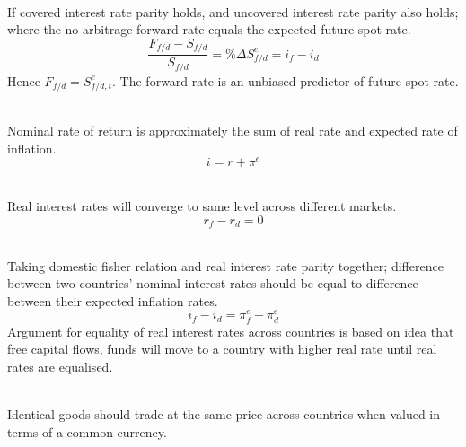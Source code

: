 \begin{definition} \\
If covered interest rate parity holds, and uncovered interest rate parity also holds; where the no-arbitrage forward rate equals the expected future spot rate.
\begin{equation}
\frac{F_{f/d} - S_{f/d}}{S_{f/d}} = \% \Delta S^e_{f/d} = i_f - i_d \nonumber
\end{equation}
Hence $F_{f/d} = S_{f/d, t}^e$. The forward rate is an unbiased predictor of future spot rate.
\end{definition}

\begin{definition} \\
Nominal rate of return is approximately the sum of real rate and expected rate of inflation.
\begin{equation}
i = r + \pi^e \nonumber
\end{equation}
\end{definition}

\begin{definition} \\
Real interest rates will converge to same level across different markets.
\begin{equation}
r_f - r_d = 0 \nonumber
\end{equation}
\end{definition}

\begin{definition} \\
Taking domestic fisher relation and real interest rate parity together; difference between two countries' nominal interest rates should be equal to difference between their expected inflation rates.
\begin{equation}
i_f - i_d = \pi_f^e - \pi_d^e \nonumber
\end{equation}
Argument for equality of real interest rates across countries is based on idea that free capital flows, funds will move to a country with higher real rate until real rates are equalised.
\end{definition}

\begin{definition} \\
Identical goods should trade at the same price across countries when valued in terms of a common currency.
\end{definition}

